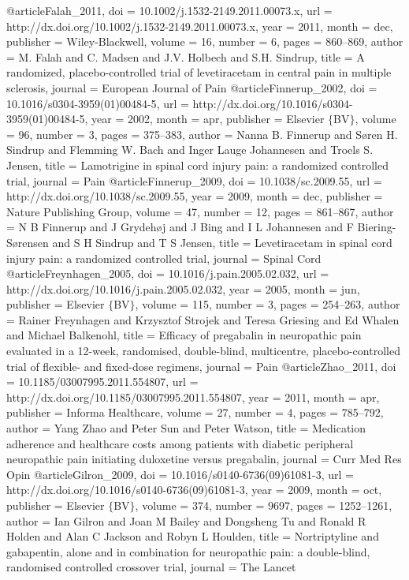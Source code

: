 @article{Falah_2011,
	doi = {10.1002/j.1532-2149.2011.00073.x},
	url = {http://dx.doi.org/10.1002/j.1532-2149.2011.00073.x},
	year = 2011,
	month = {dec},
	publisher = {Wiley-Blackwell},
	volume = {16},
	number = {6},
	pages = {860--869},
	author = {M. Falah and C. Madsen and J.V. Holbech and S.H. Sindrup},
	title = {A randomized, placebo-controlled trial of levetiracetam in central pain in multiple sclerosis},
	journal = {European Journal of Pain}
}
@article{Finnerup_2002,
	doi = {10.1016/s0304-3959(01)00484-5},
	url = {http://dx.doi.org/10.1016/s0304-3959(01)00484-5},
	year = 2002,
	month = {apr},
	publisher = {Elsevier $\lbrace$BV$\rbrace$},
	volume = {96},
	number = {3},
	pages = {375--383},
	author = {Nanna B. Finnerup and S{\o}ren H. Sindrup and Flemming W. Bach and Inger Lauge Johannesen and Troels S. Jensen},
	title = {Lamotrigine in spinal cord injury pain: a randomized controlled trial},
	journal = {Pain}
}
@article{Finnerup_2009,
	doi = {10.1038/sc.2009.55},
	url = {http://dx.doi.org/10.1038/sc.2009.55},
	year = 2009,
	month = {dec},
	publisher = {Nature Publishing Group},
	volume = {47},
	number = {12},
	pages = {861--867},
	author = {N B Finnerup and J Grydeh{\o}j and J Bing and I L Johannesen and F Biering-S{\o}rensen and S H Sindrup and T S Jensen},
	title = {Levetiracetam in spinal cord injury pain: a randomized controlled trial},
	journal = {Spinal Cord}
}
@article{Freynhagen_2005,
	doi = {10.1016/j.pain.2005.02.032},
	url = {http://dx.doi.org/10.1016/j.pain.2005.02.032},
	year = 2005,
	month = {jun},
	publisher = {Elsevier $\lbrace$BV$\rbrace$},
	volume = {115},
	number = {3},
	pages = {254--263},
	author = {Rainer Freynhagen and Krzysztof Strojek and Teresa Griesing and Ed Whalen and Michael Balkenohl},
	title = {Efficacy of pregabalin in neuropathic pain evaluated in a 12-week, randomised, double-blind, multicentre, placebo-controlled trial of flexible- and fixed-dose regimens},
	journal = {Pain}
}
@article{Zhao_2011,
	doi = {10.1185/03007995.2011.554807},
	url = {http://dx.doi.org/10.1185/03007995.2011.554807},
	year = 2011,
	month = {apr},
	publisher = {Informa Healthcare},
	volume = {27},
	number = {4},
	pages = {785--792},
	author = {Yang Zhao and Peter Sun and Peter Watson},
	title = {Medication adherence and healthcare costs among patients with diabetic peripheral neuropathic pain initiating duloxetine versus pregabalin},
	journal = {Curr Med Res Opin}
}
@article{Gilron_2009,
	doi = {10.1016/s0140-6736(09)61081-3},
	url = {http://dx.doi.org/10.1016/s0140-6736(09)61081-3},
	year = 2009,
	month = {oct},
	publisher = {Elsevier $\lbrace$BV$\rbrace$},
	volume = {374},
	number = {9697},
	pages = {1252--1261},
	author = {Ian Gilron and Joan M Bailey and Dongsheng Tu and Ronald R Holden and Alan C Jackson and Robyn L Houlden},
	title = {Nortriptyline and gabapentin, alone and in combination for neuropathic pain: a double-blind, randomised controlled crossover trial},
	journal = {The Lancet}
}
